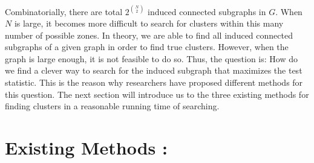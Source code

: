 \documentclass[12pt]{article}
\begin{document}
				Combinatorially, there are total $2^ {\binom{N}{2}}$ induced connected subgraphs in $G$. When $N$ is large, it becomes more difficult to search for clusters within this many number of possible zones. In theory, we are able to find all induced connected subgraphs of a given graph in order to find true clusters. However, when the graph is large enough, it is not feasible to do so. Thus, the question is: How do we find a clever way to search for the induced subgraph that maximizes the test statistic. This is the reason why researchers have proposed different methods for this question. The next section will introduce us to the three existing methods for finding clusters in a reasonable running time of searching.\\
			
			
\section{Existing Methods :} 
			
\end{document}
